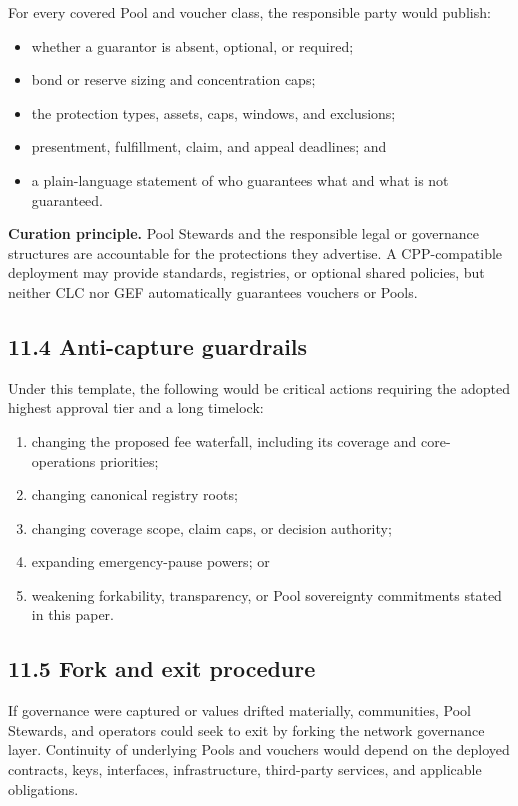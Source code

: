 \documentclass[11pt]{article}
\begin{document}
For every covered Pool and voucher class, the responsible party would publish:

\begin{itemize}[leftmargin=*]
\item whether a guarantor is absent, optional, or required;
\item bond or reserve sizing and concentration caps;
\item the protection types, assets, caps, windows, and exclusions;
\item presentment, fulfillment, claim, and appeal deadlines; and
\item a plain-language statement of who guarantees what and what is not guaranteed.
\end{itemize}
\textbf{Curation principle.} Pool Stewards and the responsible legal or governance structures are accountable for the protections they advertise. A CPP-compatible deployment may provide standards, registries, or optional shared policies, but neither CLC nor GEF automatically guarantees vouchers or Pools.

\subsection*{11.4 Anti-capture guardrails}

Under this template, the following would be critical actions requiring the adopted highest approval tier and a long timelock:

\begin{enumerate}[leftmargin=*]
\item changing the proposed fee waterfall, including its coverage and core-operations priorities;
\item changing canonical registry roots;
\item changing coverage scope, claim caps, or decision authority;
\item expanding emergency-pause powers; or
\item weakening forkability, transparency, or Pool sovereignty commitments stated in this paper.
\end{enumerate}
\subsection*{11.5 Fork and exit procedure}

If governance were captured or values drifted materially, communities, Pool Stewards, and operators could seek to exit by forking the network governance layer. Continuity of underlying Pools and vouchers would depend on the deployed contracts, keys, interfaces, infrastructure, third-party services, and applicable obligations.
\end{document}
